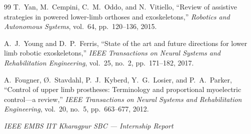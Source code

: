 \documentclass[12pt,a4paper]{article}
\begin{document}
\begin{thebibliography}{99}
T.~Yan, M.~Cempini, C.~M.~Oddo, and N.~Vitiello, ``Review of assistive strategies in powered lower-limb orthoses and exoskeletons,'' \textit{Robotics and Autonomous Systems}, vol.~64, pp.~120--136, 2015.

A.~J.~Young and D.~P.~Ferris, ``State of the art and future directions for lower limb robotic exoskeletons,'' \textit{IEEE Transactions on Neural Systems and Rehabilitation Engineering}, vol.~25, no.~2, pp.~171--182, 2017.

A.~Fougner, \O.~Stavdahl, P.~J.~Kyberd, Y.~G.~Losier, and P.~A.~Parker, ``Control of upper limb prostheses: Terminology and proportional myoelectric control---a review,'' \textit{IEEE Transactions on Neural Systems and Rehabilitation Engineering}, vol.~20, no.~5, pp.~663--677, 2012.
\end{thebibliography}

\vfill
\begin{center}
    \footnotesize\textit{IEEE EMBS IIT Kharagpur SBC --- Internship Report}
\end{center}
\end{document}
